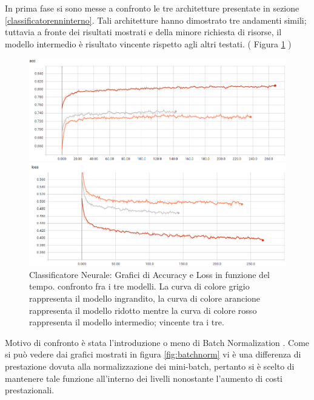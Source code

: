 In prima fase si sono messe a confronto le tre architetture presentate in sezione \ref{classificatorenninterno}. Tali architetture hanno dimostrato tre andamenti simili; tuttavia a fronte dei risultati mostrati e della minore richiesta di risorse, il modello intermedio è risultato vincente rispetto agli altri testati. ( Figura \ref{fig:cfrmlp} )

\begin{figure}[!bp] 
\centering
	\begin{minipage}[t]{\linewidth}
		\includegraphics[width=\linewidth]{figures/MLP1.png}
	\end{minipage}\hfill
	\begin{minipage}[b]{\linewidth}
		\includegraphics[width=\linewidth]{figures/MLP2.png}
	\end{minipage}
	\caption{Classificatore Neurale: Grafici di Accuracy e Loss  in funzione del tempo. confronto fra i tre modelli. La curva di colore grigio rappresenta il modello ingrandito, la curva di colore arancione rappresenta il modello ridotto mentre la curva di colore rosso rappresenta il modello intermedio; vincente tra i tre. \label{fig:cfrmlp}}
\end{figure}

Motivo di confronto è stata l'introduzione o meno di Batch Normalization \cite{1502.03167}. Come si può vedere dai grafici mostrati in figura \ref{fig:batchnorm} vi è una differenza di prestazione dovuta alla normalizzazione dei mini-batch, pertanto si è scelto di mantenere tale funzione all'interno dei livelli nonostante l'aumento di costi prestazionali.

